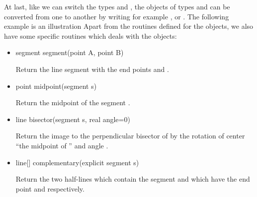 \documentclass[pdftex]{article}
\begin{document}
At last, like we can switch the types  and ,
the objects of types  and  can be converted
from one to another by writing for example
,\linebreak
{} or
.
The following example is an illustration
{}
Apart from the routines defined for the  objects, we also
have some specific routines which deals with the 
objects:
\begin{itemize}
\item {}%
  \begin{Vcolor}
    segment segment(point A, point B)
  \end{Vcolor}
  Return the line segment with the end points  and .
\item {}%
  \begin{Vcolor}
    point midpoint(segment s)
  \end{Vcolor}
  Return the midpoint of the segment .
\item {}%
  \begin{Vcolor}
    line bisector(segment s, real angle=0)
  \end{Vcolor}
  Return the image to the perpendicular bisector of  by the
  rotation of center ``the midpoint of '' and angle .
\item {}%
  \begin{Vcolor}
    line[] complementary(explicit segment s)
  \end{Vcolor}
  Return the two half-lines which contain the segment  and
  which have the end point  and  respectively.
\end{itemize}
\end{document}

